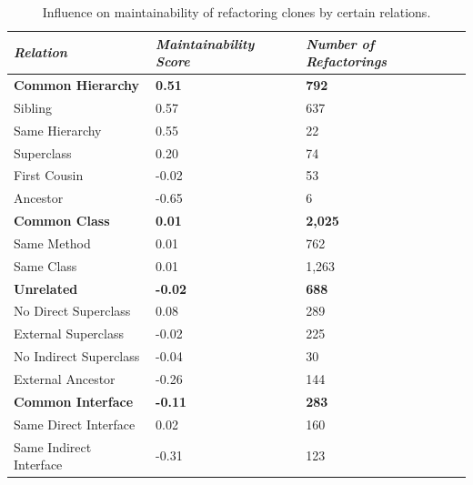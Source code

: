 \begin{table}[H]
\centering
\begin{tabular}{@{}lll@{}}
\toprule
\textit{\textbf{Relation}} & \textit{\textbf{Maintainability Score}} & \textit{\textbf{Number of Refactorings}} \\ \midrule
\textbf{Common Hierarchy} & \textbf{0.51} & \textbf{792} \\ \midrule
\hspace{10pt} Sibling & 0.57 & 637 \\
\rowcolor[HTML]{FFCCC9}
\hspace{10pt} Same Hierarchy & 0.55 & 22 \\
\rowcolor[HTML]{FFCCC9}
\hspace{10pt} Superclass & 0.20 & 74 \\
\rowcolor[HTML]{FFCCC9}
\hspace{10pt} First Cousin & -0.02 & 53 \\
\rowcolor[HTML]{FFCCC9}
\hspace{10pt} Ancestor & -0.65 & 6 \\ \midrule
\textbf{Common Class} & \textbf{0.01} & \textbf{2,025}\\ \midrule
\hspace{10pt} Same Method & 0.01 & 762  \\
\hspace{10pt} Same Class & 0.01 & 1,263 \\ \midrule
\textbf{Unrelated} & \textbf{-0.02} & \textbf{688}\\ \midrule
\hspace{10pt} No Direct Superclass & 0.08 & 289 \\
\hspace{10pt} External Superclass & -0.02 & 225  \\
\rowcolor[HTML]{FFCCC9}
\hspace{10pt} No Indirect Superclass & -0.04 & 30  \\
\hspace{10pt} External Ancestor & -0.26 & 144  \\ \midrule
\textbf{Common Interface} & \textbf{-0.11} & \textbf{283} \\ \midrule
\hspace{10pt} Same Direct Interface & 0.02 & 160 \\
\hspace{10pt} Same Indirect Interface & -0.31 & 123
\end{tabular}
\caption{Influence on maintainability of refactoring clones by certain relations.}
\label{tab:relation_refactor}
\end{table}

